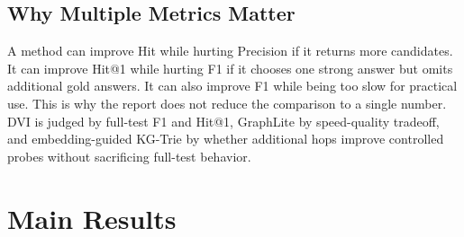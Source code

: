 \documentclass[10pt,twocolumn]{article}
\begin{document}
\subsection{Why Multiple Metrics Matter}
A method can improve Hit while hurting Precision if it returns more candidates. It can improve Hit@1 while hurting F1 if it chooses one strong answer but omits additional gold answers. It can also improve F1 while being too slow for practical use. This is why the report does not reduce the comparison to a single number. DVI is judged by full-test F1 and Hit@1, GraphLite by speed-quality tradeoff, and embedding-guided KG-Trie by whether additional hops improve controlled probes without sacrificing full-test behavior.

\section{Main Results}
\begin{table}[t]
\centering
\small
{}
\caption{Full-test RoG-CWQ results. Values are percentages except time. Routed DVI uses DVI only when the final candidate set has exactly two entities; otherwise it keeps the corresponding GCR prediction.}
\label{tab:main}
\end{table}
\end{document}
